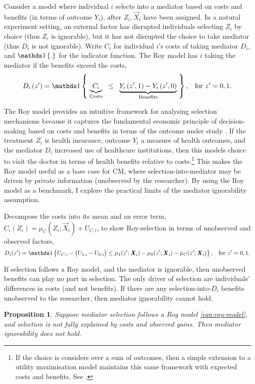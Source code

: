 Consider a model where individual $i$ selects into a mediator based on costs and benefits (in terms of outcome $Y_i$), after $Z_i, \vec X_i$ have been assigned.
In a natural experiment setting, an external factor has disrupted individuals selecting $Z_i$ by choice (thus $Z_i$ is ignorable), but it has not disrupted the choice to take mediator (thus $D_i$ is not ignorable).
Write $C_i$ for individual $i$'s costs of taking mediator $D_i$, and $\indicator{.}$ for the indicator function.
The Roy model has $i$ taking the mediator if the benefits exceed the costs,
\begin{equation}
    \label{eqn:roy-model}
    D_i \left( z' \right) = \indicator{ \;
    \underbrace{C_i}_{\text{Costs}} \;\; \leq \;\;
        \underbrace{
            Y_i\left( z', 1 \right) - Y_i\left( z', 0 \right)}_{\text{Benefits}}
    \;}, \;\;\; \text{for } z'=0,1.
\end{equation}

The Roy model provides an intuitive framework for analysing selection mechanisms because it captures the fundamental economic principle of decision-making based on costs and benefits in terms of the outcome under study \citep{roy1951some,heckman1990empirical}.
If the treatment $Z_i$ is health insurance, outcome $Y_i$ a measure of health outcomes, and the mediator $D_i$ increased use of healthcare institutions, then this models choice to visit the doctor in terms of health benefits relative to costs.\footnote{
    If the choice is considers over a sum of outcomes, then a simple extension to a utility maximisation model maintains this same framework with expected costs and benefits.
    See \cite{heckman1990empirical,eisenhauer2015generalized}.
}
This makes the Roy model useful as a base case for CM, where selection-into-mediator may be driven by private information (unobserved by the researcher).
By using the Roy model as a benchmark, I explore the practical limits of the mediator ignorability assumption.

Decompose the costs into its mean and an error term, $C_i(Z_i) = \mu_{C}(Z_i; \vec X_i) + U_{C,i}$, to show Roy-selection in terms of unobserved and observed factors,
\[ D_i(z') = \indicator{
    U_{C,i} - \big(U_{1,i} - U_{0,i}\big) \leq
        \mu_1(z'; \vec X_i) - \mu_0(z'; \vec X_i) - \mu_C(z'; \vec X_i)
    }, \;\;\; \text{for } z' = 0, 1. \]

If selection follows a Roy model, and the mediator is ignorable, then unobserved benefits can play no part in selection.
The only driver of selection are individuals' differences in costs (and not benefits).
If there are any selection-into-$D_i$ benefits unobserved to the researcher, then mediator ignorability cannot hold.
\newtheorem{proposition}{Proposition}
\begin{proposition}
    \label{prop:roy-seq-ig}
    Suppose mediator selection follows a Roy model \eqref{eqn:roy-model}, and selection is not fully explained by costs and observed gains.
    Then mediator ignorability does not hold.
\end{proposition}

